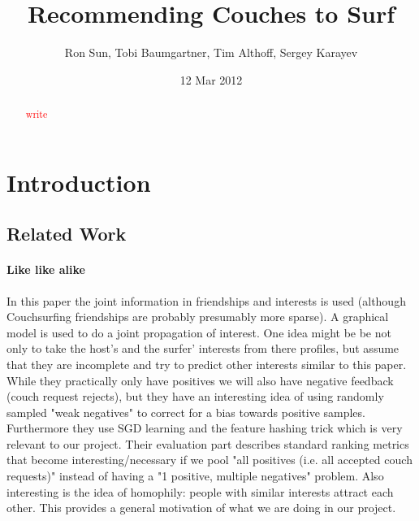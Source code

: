 \documentclass[11pt]{article}
\title{Recommending Couches to Surf}
\author{Ron Sun, Tobi Baumgartner, Tim Althoff, Sergey Karayev}
\date{12 Mar 2012}
\newcommand{\todo}[1]{\textcolor{red}{#1}}
\begin{document}
\maketitle

\begin{abstract}
\todo{write}
\end{abstract}

\section{Introduction}

\subsection{Related Work}


\paragraph{Like like alike} \cite{Yang2011}
In this paper the joint information in friendships and interests is used (although Couchsurfing friendships are probably presumably more sparse).
A graphical model is used to do a joint propagation of interest.
One idea might be be not only to take the host's and the surfer' interests from there profiles, but assume that they are incomplete and try to predict other interests similar to this paper. While they practically only have positives we will also have negative feedback (couch request rejects), but they have an interesting idea of using randomly sampled "weak negatives" to correct for a bias towards positive samples.
Furthermore they use SGD learning and the feature hashing trick which is very relevant to our project.
Their evaluation part describes standard ranking metrics that become interesting/necessary if we pool "all positives (i.e. all accepted couch requests)" instead of having a "1 positive, multiple negatives" problem.
Also interesting is the idea of homophily: people with similar interests attract each other. This provides a general motivation of what we are doing in our project.
\end{document}
